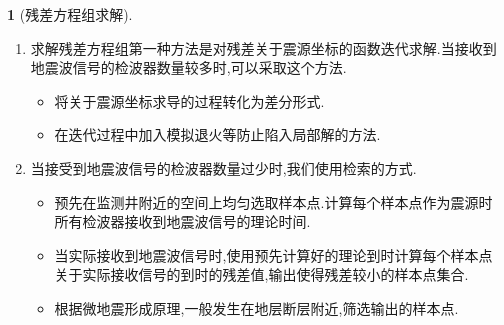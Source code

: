 \documentclass[UTF8]{ctexbeamer}	%
\theoremstyle{plain}
\theoremstyle{definition}
\newtheorem{emt}{}[section]
\theoremstyle{remark}
\numberwithin{equation}{section}
\begin{document}
\begin{frame}
    \begin{emt}[残差方程组求解]
        \begin{enumerate}
            \item 求解残差方程组第一种方法是对残差关于震源坐标的函数迭代求解.当接收到
            地震波信号的检波器数量较多时,可以采取这个方法.
            \begin{itemize}
                \item 将关于震源坐标求导的过程转化为差分形式.
                \item 在迭代过程中加入模拟退火等防止陷入局部解的方法.
            \end{itemize}

            \item 
            当接受到地震波信号的检波器数量过少时,我们使用检索的方式.

            \begin{itemize}
                \item 预先在监测井附近的空间上均匀选取样本点.计算每个样本点作为震源时
                所有检波器接收到地震波信号的理论时间.

                \item 当实际接收到地震波信号时,使用预先计算好的理论到时计算每个样本点
                关于实际接收信号的到时的残差值,输出使得残差较小的样本点集合.

                \item 根据微地震形成原理,一般发生在地层断层附近,筛选输出的样本点.
            \end{itemize}
        \end{enumerate}
    \end{emt}
\end{frame}
\end{document}
